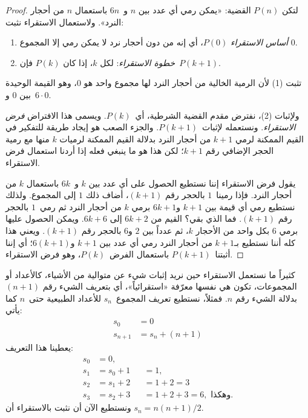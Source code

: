 \documentclass[../../../include/open-logic-section]{subfiles}
\begin{document}
\begin{proof}
لتكن $P(n)$ القضية: «يمكن رمي أي عدد بين $n$ و~$6n$ باستعمال $n$ من
أحجار النرد». ولاستعمال الاستقراء نثبت:
\begin{enumerate}
\item \emph{أساس الاستقراء} $P(0)$، أي إنه من دون أحجار نرد لا يمكن
  رمي إلا المجموع $0$.
\item \emph{خطوة الاستقراء}: لكل $k$، إذا كان $P(k)$ فإن~$P(k+1)$.
\end{enumerate}

تثبت (1) لأن الرمية الخالية من أحجار النرد لها مجموع واحد هو $0$، وهو
القيمة الوحيدة بين $0$ و~$6\cdot0$.

ولإثبات (2)، نفترض مقدم القضية الشرطية، أي~$P(k)$. ويسمى هذا الافتراض
\emph{فرض الاستقراء}. ونستعمله لإثبات~$P(k+1)$. والجزء الصعب هو إيجاد
طريقة للتفكير في القيم الممكنة لرمي $k+1$ من أحجار النرد بدلالة القيم
الممكنة لرميات $k$ منها مع رمية الحجر الإضافي رقم $k+1$؛ لكن هذا هو ما
ينبغي فعله إذا أردنا استعمال فرض الاستقراء.

يقول فرض الاستقراء إننا نستطيع الحصول على أي عدد بين $k$ و~$6k$
باستعمال $k$ من أحجار النرد. فإذا رمينا~$1$ بالحجر رقم $(k+1)$، أضاف
ذلك $1$ إلى المجموع. ولذلك نستطيع رمي أي قيمة بين $k+1$ و$6k+1$ برمي
$k$ من أحجار النرد ثم رمي~$1$ بالحجر رقم $(k+1)$. فما الذي بقي؟ القيم
من $6k+2$ إلى $6k+6$. ويمكن الحصول عليها برمي $6$ بكل واحد من الأحجار
$k$، ثم عدداً بين $2$ و$6$ بالحجر رقم $(k+1)$. ويعني هذا كله أننا
نستطيع بـ$k+1$ من أحجار النرد رمي أي عدد بين $k+1$ و$6(k+1)$؛ أي إننا
أثبتنا~$P(k+1)$ باستعمال الفرض~$P(k)$، وهو فرض الاستقراء.
\end{proof}

كثيراً ما نستعمل الاستقراء حين نريد إثبات شيء عن متوالية من الأشياء،
كالأعداد أو المجموعات، تكون هي نفسها معرّفة «استقرائياً»، أي بتعريف
الشيء رقم $(n+1)$ بدلالة الشيء رقم $n$. فمثلاً، نستطيع تعريف
المجموع~$s_n$ للأعداد الطبيعية حتى~$n$ كما يأتي:
\begin{align*}
  s_0 & = 0\\
  s_{n+1} & = s_n + (n+1)
\end{align*}
يعطينا هذا التعريف:
\begin{align*}
  s_0 & = 0,\\
  s_1 & = s_0 + 1 && = 1,\\
  s_2 & = s_1 + 2 && = 1 + 2 = 3\\
  s_3 & = s_2 + 3 && = 1 + 2 + 3 = 6, \text{ وهكذا.}
\end{align*}
ونستطيع الآن أن نثبت بالاستقراء أن $s_n = n(n+1)/2$.
\end{document}
